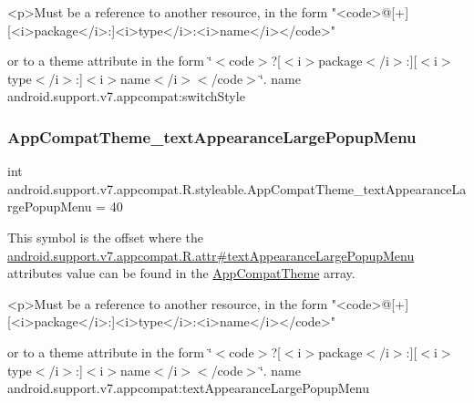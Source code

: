 \begin{DoxyVerb}      <p>Must be a reference to another resource, in the form "<code>@[+][<i>package</i>:]<i>type</i>:<i>name</i></code>"
\end{DoxyVerb}
 or to a theme attribute in the form \char`\"{}$<$code$>$?\mbox{[}$<$i$>$package$<$/i$>$\+:\mbox{]}\mbox{[}$<$i$>$type$<$/i$>$\+:\mbox{]}$<$i$>$name$<$/i$>$$<$/code$>$\char`\"{}.  name android.\+support.\+v7.\+appcompat\+:switch\+Style \mbox{\label{classandroid_1_1support_1_1v7_1_1appcompat_1_1R_1_1styleable_a8ecc7b52c9caba35359833cfc27874d8}} 
\subsubsection{\texorpdfstring{App\+Compat\+Theme\+\_\+text\+Appearance\+Large\+Popup\+Menu}{AppCompatTheme\_textAppearanceLargePopupMenu}}
{\footnotesize\ttfamily int android.\+support.\+v7.\+appcompat.\+R.\+styleable.\+App\+Compat\+Theme\+\_\+text\+Appearance\+Large\+Popup\+Menu = 40\hspace{0.3cm}{\ttfamily [static]}}

This symbol is the offset where the \hyperlink{classandroid_1_1support_1_1v7_1_1appcompat_1_1R_1_1attr_abd33adb2cdd277a5d91cc85a8800492b}{android.\+support.\+v7.\+appcompat.\+R.\+attr\#text\+Appearance\+Large\+Popup\+Menu} attribute\textquotesingle{}s value can be found in the \hyperlink{classandroid_1_1support_1_1v7_1_1appcompat_1_1R_1_1styleable_a5c42f89e8a410c323be34208d75c430b}{App\+Compat\+Theme} array.

\begin{DoxyVerb}      <p>Must be a reference to another resource, in the form "<code>@[+][<i>package</i>:]<i>type</i>:<i>name</i></code>"
\end{DoxyVerb}
 or to a theme attribute in the form \char`\"{}$<$code$>$?\mbox{[}$<$i$>$package$<$/i$>$\+:\mbox{]}\mbox{[}$<$i$>$type$<$/i$>$\+:\mbox{]}$<$i$>$name$<$/i$>$$<$/code$>$\char`\"{}.  name android.\+support.\+v7.\+appcompat\+:text\+Appearance\+Large\+Popup\+Menu \mbox{\label{classandroid_1_1support_1_1v7_1_1appcompat_1_1R_1_1styleable_a59547599ad3f87d998f6508204f27aa1}} 
